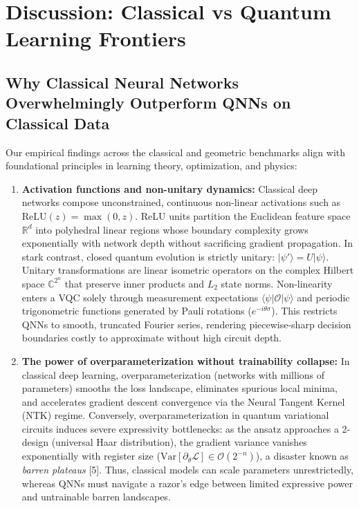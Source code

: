 \section{Discussion: Classical vs Quantum Learning Frontiers}\label{sec:frontiers}

\subsection{Why Classical Neural Networks Overwhelmingly Outperform QNNs on Classical Data}
Our empirical findings across the classical and geometric benchmarks align with foundational principles in learning theory, optimization, and physics:
\begin{enumerate}[leftmargin=*]
  \item \textbf{Activation functions and non-unitary dynamics:} Classical deep networks compose unconstrained, continuous non-linear activations such as $\text{ReLU}(z) = \max(0, z)$. ReLU units partition the Euclidean feature space $\mathbb{R}^d$ into polyhedral linear regions whose boundary complexity grows exponentially with network depth without sacrificing gradient propagation. In stark contrast, closed quantum evolution is strictly unitary: $|\psi'\rangle = U|\psi\rangle$. Unitary transformations are linear isometric operators on the complex Hilbert space $\mathbb{C}^{2^n}$ that preserve inner products and $L_2$ state norms. Non-linearity enters a VQC solely through measurement expectations $\langle \psi | \mathcal{O} | \psi \rangle$ and periodic trigonometric functions generated by Pauli rotations ($e^{-i \theta \sigma}$). This restricts QNNs to smooth, truncated Fourier series, rendering piecewise-sharp decision boundaries costly to approximate without high circuit depth.
  \item \textbf{The power of overparameterization without trainability collapse:} In classical deep learning, overparameterization (networks with millions of parameters) smooths the loss landscape, eliminates spurious local minima, and accelerates gradient descent convergence via the Neural Tangent Kernel (NTK) regime. Conversely, overparameterization in quantum variational circuits induces severe expressivity bottlenecks: as the ansatz approaches a 2-design (universal Haar distribution), the gradient variance vanishes exponentially with register size ($\text{Var}[\partial_\theta \mathcal{L}] \in \mathcal{O}(2^{-n})$), a disaster known as \emph{barren plateaus} [5]. Thus, classical models can scale parameters unrestrictedly, whereas QNNs must navigate a razor's edge between limited expressive power and untrainable barren landscapes.

\end{enumerate}
